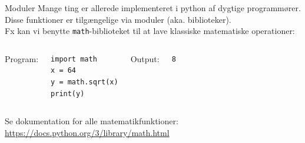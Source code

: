 \documentclass{beamer}
\begin{document}
\begin{frame}[fragile]{Moduler}
Mange ting er allerede implementeret i python af dygtige programmører.
Disse funktioner er tilgængelige via moduler (aka. biblioteker). \\
Fx kan vi benytte \texttt{math}-biblioteket til at lave klassiske matematiske operationer:

\bigskip
\begin{columns}
Program:
\begin{lstlisting}[style=python]
import math
x = 64
y = math.sqrt(x)
print(y)
\end{lstlisting}
Output:
\begin{lstlisting}[style=python]
8
\end{lstlisting}
\end{columns}


Se dokumentation for alle matematikfunktioner:
\url{https://docs.python.org/3/library/math.html}
\end{frame}
\end{document}
